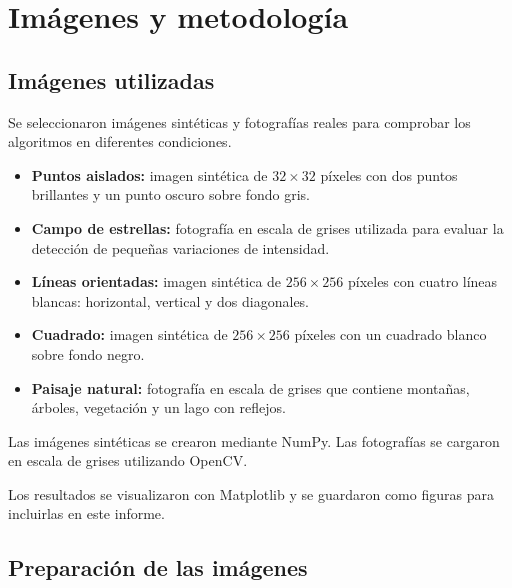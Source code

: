 \documentclass[11pt,letterpaper]{article}
\begin{document}
\section{Imágenes y metodología}

\subsection{Imágenes utilizadas}

Se seleccionaron imágenes sintéticas
y fotografías reales para comprobar
los algoritmos en diferentes condiciones.

\begin{itemize}

    \item \textbf{Puntos aislados:}
    imagen sintética de $32\times32$
    píxeles con dos puntos brillantes
    y un punto oscuro sobre fondo gris.

    \item \textbf{Campo de estrellas:}
    fotografía en escala de grises
    utilizada para evaluar la detección
    de pequeñas variaciones de intensidad.

    \item \textbf{Líneas orientadas:}
    imagen sintética de $256\times256$
    píxeles con cuatro líneas blancas:
    horizontal, vertical y dos diagonales.

    \item \textbf{Cuadrado:}
    imagen sintética de $256\times256$
    píxeles con un cuadrado blanco
    sobre fondo negro.

    \item \textbf{Paisaje natural:}
    fotografía en escala de grises
    que contiene montañas, árboles,
    vegetación y un lago con reflejos.

\end{itemize}

Las imágenes sintéticas se crearon mediante
NumPy. Las fotografías se cargaron en escala
de grises utilizando OpenCV.

Los resultados se visualizaron con Matplotlib
y se guardaron como figuras para incluirlas
en este informe.

\subsection{Preparación de las imágenes}
\end{document}
